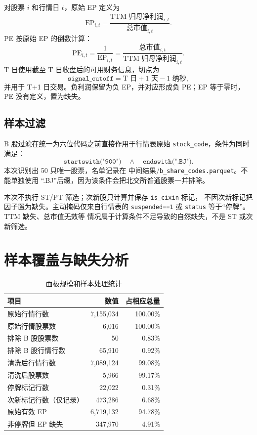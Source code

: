 \documentclass[UTF8,a4paper,11pt]{ctexart}
\newcommand{\EP}{\mathrm{EP}}
\newcommand{\PE}{\mathrm{PE}}
\newcommand{\filepath}[2]{\textnormal{#1/}\texttt{#2}}
\begin{document}
对股票 $i$ 和行情日 $t$，原始 EP 定义为
\begin{equation}
  \EP_{i,t} =
  \frac{\text{TTM 归母净利润}_{i,t}}{\text{总市值}_{i,t}}.
\end{equation}
PE 按原始 EP 的倒数计算：
\begin{equation}
  \PE_{i,t}=\frac{1}{\EP_{i,t}}
  =\frac{\text{总市值}_{i,t}}{\text{TTM 归母净利润}_{i,t}}.
\end{equation}
T 日使用截至 T 日收盘后的可用财务信息，切点为
\[
  \texttt{signal\_cutoff}
  =\text{T 日}+1\text{ 天}-1\text{ 纳秒},
\]
并用于 T+1 日交易。负利润保留为负 EP，并对应形成负 PE；EP 等于零时，
PE 没有定义，置为缺失。

\subsection{样本过滤}

B 股过滤在统一为六位代码之前直接作用于行情表原始
\texttt{stock\_code}，条件为同时满足：
\[
  \texttt{startswith("900")} \quad\land\quad
  \texttt{endswith(".BJ")}.
\]
本次识别出 50 只唯一股票，名单记录在
\filepath{中间结果}{b\_share\_codes.parquet}。不能单独使用
\textquotedblleft .BJ\textquotedblright 后缀，因为该条件会把北交所普通股票一并排除。

本次不执行 ST/PT 筛选；次新股只计算并保存 \texttt{is\_cixin} 标记，
不因次新标记把因子置为缺失。主动掩码仅来自行情表的
\texttt{suspended==1} 或 \texttt{status} 等于“停牌”。TTM 缺失、总市值无效等
情况属于计算条件不足导致的自然缺失，不是 ST 或次新筛选。

\section{样本覆盖与缺失分析}

\begin{table}[H]
\centering
\caption{面板规模和样本处理统计}
\begin{tabular}{lrr}
\toprule
项目 & 数值 & 占相应总量 \\
\midrule
原始行情行数 & 7,155,034 & 100.00\% \\
原始行情股票数 & 6,016 & 100.00\% \\
排除 B 股股票数 & 50 & 0.83\% \\
排除 B 股行情行数 & 65,910 & 0.92\% \\
清洗后行情行数 & 7,089,124 & 99.08\% \\
清洗后股票数 & 5,966 & 99.17\% \\
停牌标记行数 & 22,022 & 0.31\% \\
次新标记行数（仅记录） & 473,286 & 6.68\% \\
原始有效 EP & 6,719,132 & 94.78\% \\
非停牌但 EP 缺失 & 347,970 & 4.91\% \\
\bottomrule
\end{tabular}
\end{table}
\end{document}
